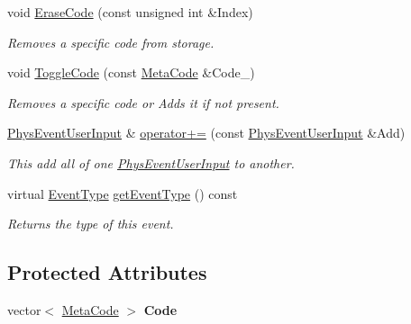 \begin{DoxyCompactItemize}
void \hyperlink{classPhysEventUserInput_a8cbbee3c2be3bd12746ad442fce526e4}{EraseCode} (const unsigned int \&Index)
\begin{DoxyCompactList}\small\item\em Removes a specific code from storage. \item\end{DoxyCompactList}\item 
void \hyperlink{classPhysEventUserInput_a8325bb0172db6ea02fd06f4a5d1a7378}{ToggleCode} (const \hyperlink{classphys_1_1MetaCode}{MetaCode} \&Code\_\-)
\begin{DoxyCompactList}\small\item\em Removes a specific code or Adds it if not present. \item\end{DoxyCompactList}\item 
\hyperlink{classPhysEventUserInput}{PhysEventUserInput} \& \hyperlink{classPhysEventUserInput_a257c2e093b5736324e39d5fac0d6de2a}{operator+=} (const \hyperlink{classPhysEventUserInput}{PhysEventUserInput} \&Add)
\begin{DoxyCompactList}\small\item\em This add all of one \hyperlink{classPhysEventUserInput}{PhysEventUserInput} to another. \item\end{DoxyCompactList}\item 
virtual \hyperlink{classphys_1_1Event_af5fdbb3e08d8e578d58770fbc606fda7}{EventType} \hyperlink{classPhysEventUserInput_a2a39643cd222f7af0db7b087e0441582}{getEventType} () const 
\begin{DoxyCompactList}\small\item\em Returns the type of this event. \item\end{DoxyCompactList}\end{DoxyCompactItemize}
\subsection*{Protected Attributes}
\begin{DoxyCompactItemize}
\item 
\hypertarget{classPhysEventUserInput_a51607772d8a5b9f401ad0efc964ec129}{
vector$<$ \hyperlink{classphys_1_1MetaCode}{MetaCode} $>$ {\bfseries Code}}
\label{dc/d0e/classPhysEventUserInput_a51607772d8a5b9f401ad0efc964ec129}

\end{DoxyCompactItemize}


